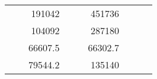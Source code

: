 \begin{table}[H]
\begin{tabular}{|ccrccrccc}
\multicolumn{1}{|c|}{\cellcolor[HTML]{FFFFC7}}                                & \multicolumn{1}{c|}{\cellcolor[HTML]{DDFDFF}}                      & \multicolumn{1}{r|}{\cellcolor[HTML]{DAE8FC}191042}    & \multicolumn{1}{c|}{\cellcolor[HTML]{FFFFC7}}                                & \multicolumn{1}{c|}{\cellcolor[HTML]{DDFDFF}}                       & \multicolumn{1}{r|}{\cellcolor[HTML]{DDFDFF}451736}    &                                                                              &                                                                    &                                                        \\ \cline{3-3} \cline{6-6}
\multicolumn{1}{|c|}{\cellcolor[HTML]{FFFFC7}}                                & \multicolumn{1}{c|}{\cellcolor[HTML]{DDFDFF}}                      & \multicolumn{1}{r|}{\cellcolor[HTML]{DDFDFF}104092}    & \multicolumn{1}{c|}{\cellcolor[HTML]{FFFFC7}}                                & \multicolumn{1}{c|}{\cellcolor[HTML]{DDFDFF}}                       & \multicolumn{1}{r|}{\cellcolor[HTML]{DAE8FC}287180}    &                                                                              &                                                                    &                                                        \\ \cline{3-3} \cline{6-6}
\multicolumn{1}{|c|}{\cellcolor[HTML]{FFFFC7}}                                & \multicolumn{1}{c|}{\cellcolor[HTML]{DDFDFF}}                      & \multicolumn{1}{r|}{\cellcolor[HTML]{DAE8FC}66607.5}   & \multicolumn{1}{c|}{\cellcolor[HTML]{FFFFC7}}                                & \multicolumn{1}{c|}{\cellcolor[HTML]{DDFDFF}}                       & \multicolumn{1}{r|}{\cellcolor[HTML]{DDFDFF}66302.7}   &                                                                              &                                                                    &                                                        \\ \cline{3-3} \cline{6-6}
\multicolumn{1}{|c|}{\cellcolor[HTML]{FFFFC7}}                                & \multicolumn{1}{c|}{\cellcolor[HTML]{DDFDFF}}                      & \multicolumn{1}{r|}{\cellcolor[HTML]{DDFDFF}79544.2}   & \multicolumn{1}{c|}{\cellcolor[HTML]{FFFFC7}}                                & \multicolumn{1}{c|}{\cellcolor[HTML]{DDFDFF}}                       & \multicolumn{1}{r|}{\cellcolor[HTML]{DAE8FC}135140}    &                                                                              &                                                                    &                                                        \\ \cline{3-3} \cline{6-6}

\end{tabular}
\end{table}
